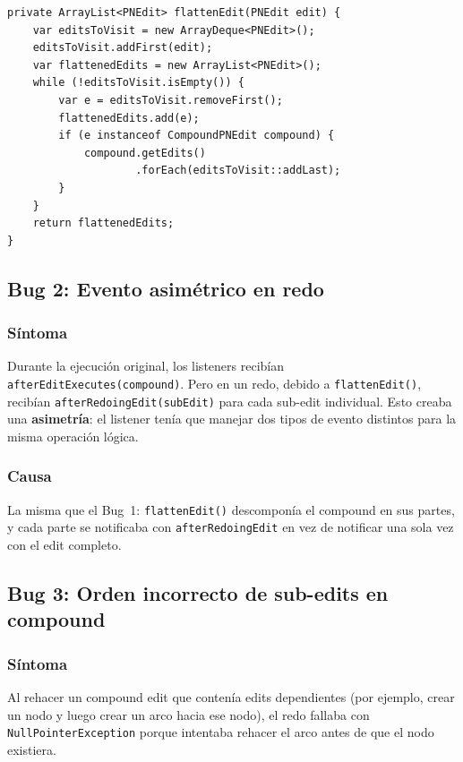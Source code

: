 \documentclass[12pt,a4paper]{article}
\newcommand{\code}[1]{\texttt{#1}}
\newcommand{\metodo}[1]{\texttt{#1}}
\begin{document}
\begin{lstlisting}[caption={Método \metodo{flattenEdit()} --- BFS que causa la duplicación.},
  label=lst:flatten]
private ArrayList<PNEdit> flattenEdit(PNEdit edit) {
    var editsToVisit = new ArrayDeque<PNEdit>();
    editsToVisit.addFirst(edit);
    var flattenedEdits = new ArrayList<PNEdit>();
    while (!editsToVisit.isEmpty()) {
        var e = editsToVisit.removeFirst();
        flattenedEdits.add(e);
        if (e instanceof CompoundPNEdit compound) {
            compound.getEdits()
                    .forEach(editsToVisit::addLast);
        }
    }
    return flattenedEdits;
}
\end{lstlisting}


\subsection{Bug 2: Evento asimétrico en redo}
\label{sec:bug2}

\subsubsection{Síntoma}

Durante la ejecución original, los listeners recibían
\metodo{afterEditExecutes(compound)}. Pero en un redo, debido a
\metodo{flattenEdit()}, recibían \metodo{afterRedoingEdit(subEdit)} para
cada sub-edit individual. Esto creaba una \textbf{asimetría}: el listener
tenía que manejar dos tipos de evento distintos para la misma operación
lógica.

\subsubsection{Causa}

La misma que el Bug~1: \metodo{flattenEdit()} descomponía el compound en
sus partes, y cada parte se notificaba con \metodo{afterRedoingEdit} en vez
de notificar una sola vez con el edit completo.


\subsection{Bug 3: Orden incorrecto de sub-edits en compound}
\label{sec:bug3}

\subsubsection{Síntoma}

Al rehacer un compound edit que contenía edits dependientes (por ejemplo,
crear un nodo y luego crear un arco hacia ese nodo), el redo fallaba con
\code{NullPointerException} porque intentaba rehacer el arco antes de que
el nodo existiera.
\end{document}
